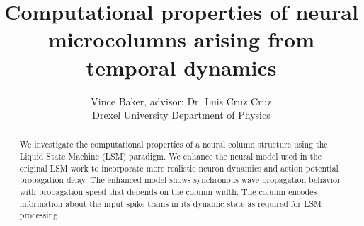 \documentclass[a4paper,11pt]{article}
\title{Computational properties of neural microcolumns arising from temporal dynamics}
\author{Vince Baker, advisor: Dr. Luis Cruz Cruz\\ Drexel University Department of Physics}
\begin{document}
\maketitle

\begin{abstract}
We investigate the computational properties of a neural column structure using the Liquid State Machine (LSM) paradigm.
We enhance the neural model used in the original LSM work to incorporate more realistic neuron dynamics and action potential propagation delay.
The enhanced model shows synchronous wave propagation behavior with propagation speed that depends on the column width. 
The column encodes information about the input spike trains in its dynamic state as required for LSM processing.

\end{abstract}
\end{document}
